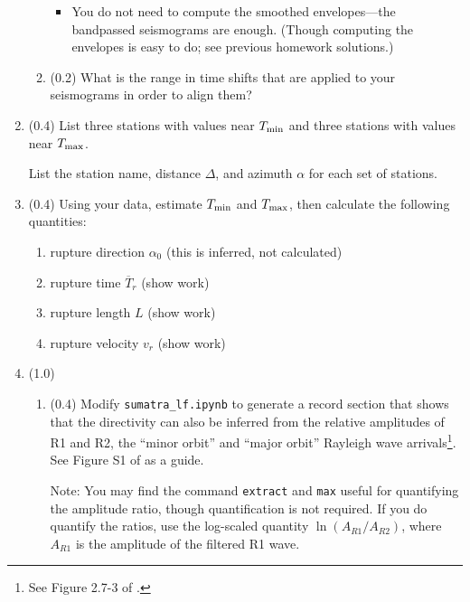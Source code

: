 \documentclass[11pt,titlepage,fleqn]{article}
\begin{document}
\begin{enumerate}
\begin{enumerate}
\begin{itemize}
\item You do not need to compute the smoothed envelopes---the bandpassed seismograms are enough. (Though computing the envelopes is easy to do; see previous homework solutions.) 
\end{itemize}

\item (0.2) What is the range in time shifts that are applied to your seismograms in order to align them?

\end{enumerate}


\item (0.4) List three stations with values near $T_{\rm min}$ and three stations with values near $T_{\rm max}$.

List the station name, distance $\Delta$, and azimuth $\alpha$ for each set of stations.



\item (0.4) Using your data, estimate $T_{\rm min}$ and $T_{\rm max}$, then calculate the following quantities:
%
\begin{enumerate}
\item rupture direction $\alpha_0$ (this is inferred, not calculated)
\item rupture time $\overline{T}_r$ (show work)
\item rupture length $L$ (show work)
\item rupture velocity $v_r$ (show work)
\end{enumerate}


\item (1.0)
%
\begin{enumerate}
\item (0.4) Modify \verb+sumatra_lf.ipynb+ to generate a record section that shows that the directivity can also be inferred from the relative amplitudes of R1 and R2, the ``minor orbit'' and ``major orbit'' Rayleigh wave arrivals\footnote{See Figure 2.7-3 of \citet{SteinWysession}.}. See Figure S1 of \citet{Ammon2005} as a guide.

Note: You may find the command \verb+extract+ and \verb+max+ useful for quantifying the amplitude ratio, though quantification is not required. If you do quantify the ratios, use the log-scaled quantity $\ln(A_{R1}/A_{R2})$, where $A_{R1}$ is the amplitude of the filtered R1 wave.


\end{enumerate}
\end{enumerate}
\end{document}
